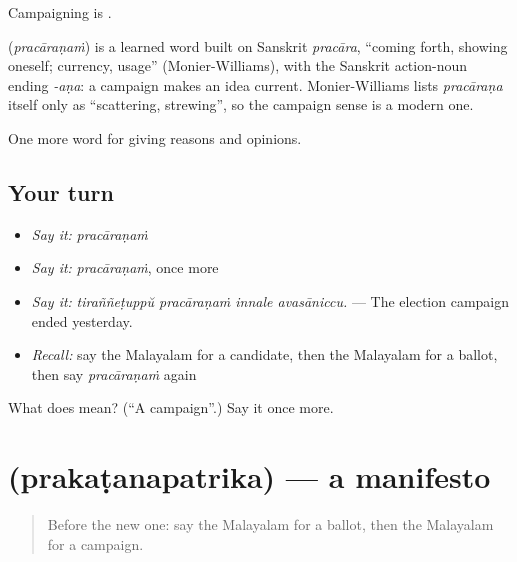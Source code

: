 Campaigning is  .

\begin{cousinweb}
\textbf{} (\emph{pracāraṇaṁ}) is a learned word built on Sanskrit \emph{pracāra}, \textquotedblleft{}coming forth, showing oneself; currency, usage\textquotedblright{} (Monier-Williams), with the Sanskrit action-noun ending \emph{-aṇa}: a campaign makes an idea current. Monier-Williams lists \emph{pracāraṇa} itself only as \textquotedblleft{}scattering, strewing\textquotedblright{}, so the campaign sense is a modern one.
\end{cousinweb}

\begin{grammarlens}[title={What you've built}]
One more word for giving reasons and opinions.
\end{grammarlens}

\subsection*{Your turn}
\begin{itemize}
\raggedright
  \item \emph{Say it:} \emph{pracāraṇaṁ}
  \item \emph{Say it:} \emph{pracāraṇaṁ}, once more
  \item \emph{Say it:} \emph{tiraññeṭuppŭ pracāraṇaṁ innale avasāniccu.} — The election campaign ended yesterday.
  \item \emph{Recall:} say the Malayalam for a candidate, then the Malayalam for a ballot, then say \emph{pracāraṇaṁ} again
\end{itemize}

\begin{tcolorbox}[breakable,colback=teal!4,colframe=teal!35!black,title={Before you move on}]
What does  mean? (\textquotedblleft{}A campaign\textquotedblright{}.) Say it once more.
\end{tcolorbox}
\section[\texorpdfstring{\ml{പ്രകടനപത്രിക} (prakaṭanapatrika)}{പ്രകടനപത്രിക (prakaṭanapatrika)}]{ (prakaṭanapatrika) — a manifesto}

\label{lesson:ML-C420-prakatanapatrika}



\begin{quote}
Before the new one: say the Malayalam for a ballot, then the Malayalam for a campaign.
\end{quote}

